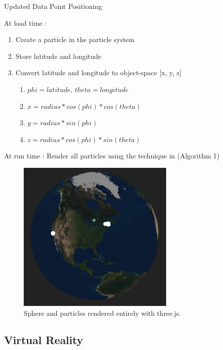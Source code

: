 \documentclass[conference]{acmsiggraph}
\begin{document}
\begin{algorithm}
\DontPrintSemicolon
\caption{Updated Data Point Positioning}
    At load time :  {
        \begin{enumerate}
            \item Create a particle in the particle system
            \item Store latitude and longitude
            \item Convert latitude and longitude to object-space [x, y, z]
                \begin{enumerate}
                    \item $phi = latitude$, $theta = longitude$
                    \item $x = radius * cos(phi) * cos(theta)$
                    \item $y = radius * sin(phi)$
                    \item $z = radius * cos(phi) * sin(theta)$
                \end{enumerate}
        \end{enumerate}
    }
    At run time :  {
        Render all particles using the technique in (Algorithm 1)
    }
\end{algorithm}

\begin{figure}
  \centering
  \includegraphics[width=3.0in]{images/threejs_sphere_earth}
  \caption{Sphere and particles rendered entirely with three.js.}
\end{figure}

\subsection{Virtual Reality}
\end{document}
